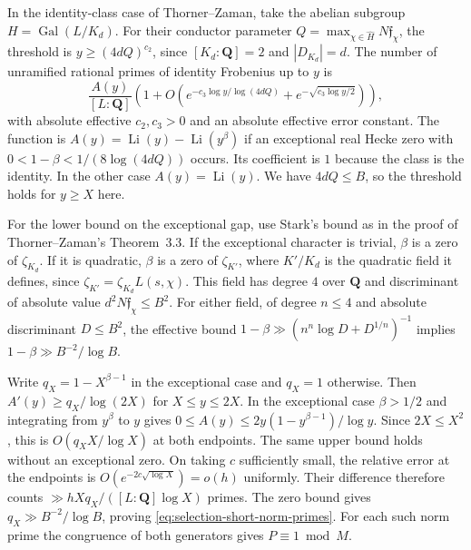 In the identity-class case of Thorner--Zaman, take the abelian
subgroup \(H=\operatorname{Gal}(L/K_d)\). For their conductor
parameter \(Q=\max_{\chi\in\widehat H}N\mathfrak f_\chi\), the
threshold is \(y\ge(4dQ)^{c_2}\), since \([K_d:\mathbf Q]=2\)
and \(|D_{K_d}|=d\). The number of unramified rational primes
of identity Frobenius up to \(y\) is
\[
 \frac{A(y)}{[L:\mathbf Q]}
 \left(1+O\!\left(e^{-c_3\log y/\log(4dQ)}
                   +e^{-\sqrt{c_3\log y/2}}\right)\right),
\]
with absolute effective \(c_2,c_3>0\) and an absolute effective
error constant. The function is
\(A(y)=\operatorname{Li}(y)-\operatorname{Li}(y^\beta)\) if an
exceptional real Hecke zero with
\(0<1-\beta<1/(8\log(4dQ))\) occurs. Its coefficient is \(1\)
because the class is the identity. In the other case
\(A(y)=\operatorname{Li}(y)\). We have \(4dQ\le B\), so the
threshold holds for \(y\ge X\) here.

For the lower bound on the exceptional gap, use Stark's bound as
in the proof of Thorner--Zaman's Theorem~3.3. If the exceptional
character is trivial, \(\beta\) is a zero of \(\zeta_{K_d}\).
If it is quadratic, \(\beta\) is a zero of \(\zeta_{K'}\), where
\(K'/K_d\) is the quadratic field it defines, since
\(\zeta_{K'}=\zeta_{K_d}L(s,\chi)\).
This field has degree \(4\) over \(\mathbf Q\) and discriminant
of absolute value \(d^2N\mathfrak f_\chi\le B^2\).
For either field, of degree \(n\le4\) and absolute
discriminant \(D\le B^2\), the effective bound
\(1-\beta\gg(n^n\log D+D^{1/n})^{-1}\) implies
\(1-\beta\gg B^{-2}/\log B\).
\cite[Theorems~1.4 and~3.3 and (1-4), pp.~1040, 1042, 1052]{f6thorner-zaman-chebotarev}

Write \(q_X=1-X^{\beta-1}\) in the exceptional case and \(q_X=1\)
otherwise. Then \(A'(y)\ge q_X/\log(2X)\) for \(X\le y\le2X\).
In the exceptional case \(\beta>1/2\) and integrating from \(y^\beta\)
to \(y\) gives \(0\le A(y)\le 2y(1-y^{\beta-1})/\log y\).
Since \(2X\le X^2\), this is \(O(q_X X/\log X)\) at both endpoints.
The same upper bound holds without an exceptional zero. On taking
\(c\) sufficiently small, the relative error at the endpoints is
\(O(e^{-2c\sqrt{\log X}})=o(h)\) uniformly. Their difference therefore
counts \(\gg hX q_X/([L:\mathbf Q]\log X)\) primes. The zero bound
gives \(q_X\gg B^{-2}/\log B\), proving \eqref{eq:selection-short-norm-primes}.
For each such norm prime the congruence of both generators gives
\(P\equiv1\bmod M\).

